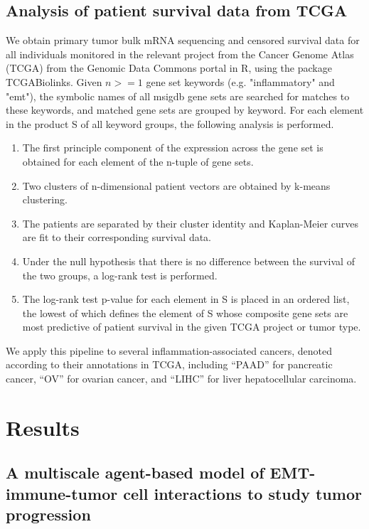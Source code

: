 \documentclass[11pt]{article}
\begin{document}
\subsection{Analysis of patient survival data from TCGA }
We obtain primary tumor bulk mRNA sequencing and censored survival data for all individuals monitored in the relevant project from the Cancer Genome Atlas (TCGA) from the Genomic Data Commons portal in R, using the package TCGABiolinks.  Given $n >= 1$ gene set keywords (e.g. "inflammatory" and "emt"), the symbolic names of all msigdb gene sets are searched for matches to these keywords, and matched gene sets are grouped by keyword. For each element in the product S of all keyword groups, the following analysis is performed.
\begin{enumerate}
     \item The first principle component of the expression across the gene set is obtained for each element of the n-tuple of gene sets.
     \item Two clusters of n-dimensional patient vectors are obtained by k-means clustering.
     \item The patients are separated by their cluster identity and Kaplan-Meier curves are fit to their corresponding survival data.
     \item Under the null hypothesis that there is no difference between the survival of the two groups, a log-rank test is performed.
     \item The log-rank test p-value for each element in S is placed in an ordered list, the lowest of which defines the element of S whose composite gene sets are most predictive of patient survival in the given TCGA project or tumor type.
\end{enumerate}
We apply this pipeline to several inflammation-associated cancers, denoted according to their annotations in TCGA, including ``PAAD'' for pancreatic cancer, ``OV'' for ovarian cancer, and ``LIHC'' for liver hepatocellular carcinoma.




\section{Results}

\subsection{A multiscale agent-based model of EMT-immune-tumor cell interactions to study tumor progression}\label{ExplModel}
\end{document}
